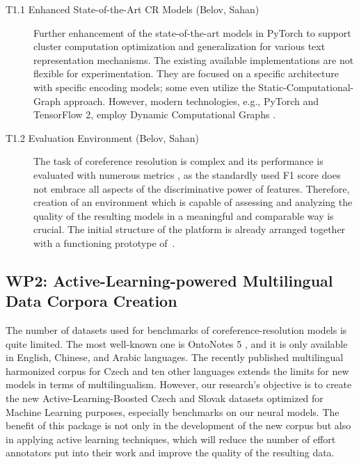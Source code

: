 \begin{description}
	\item [T1.1 Enhanced State-of-the-Art CR Models (Belov, Sahan)] Further enhancement of the state-of-the-art models in PyTorch to support cluster computation optimization and generalization for various text representation mechanisms. The existing available implementations are not flexible for experimentation. They are focused on a specific architecture with specific encoding models; some even utilize the Static-Computational-Graph approach. However, modern technologies, e.g., PyTorch and TensorFlow 2, employ Dynamic Computational Graphs \cite{computationalgraph-Neubig2017}. 
	\item [T1.2 Evaluation Environment (Belov, Sahan)] The task of coreference resolution is complex and its performance is evaluated with numerous metrics \cite{muc-Vilain1995,b3-Bagga1998,ceaf-Luo2005}, as the standardly used F1 score \cite{f1-Chen2006} does not embrace all aspects of the discriminative power of features. Therefore, creation of an environment which is capable of assessing and analyzing the quality of the resulting models in a meaningful and comparable way is crucial. The initial structure of the platform is already arranged together with a functioning prototype of~\cite{Kirstain2021S2E}. 
\end{description}


\subsection*{WP2: Active-Learning-powered Multilingual Data Corpora Creation}

 The number of datasets used for benchmarks of coreference-resolution models is quite limited. 
The most well-known one is OntoNotes 5 \cite{ontonotes5-Weischedel2013}, and it is only available in English, Chinese, and Arabic languages.
The recently published multilingual harmonized corpus for Czech and ten other languages \cite{cr-mult-Nedoluzhko2021} extends the limits for new models in terms of multilingualism. 
However, our research's objective is to create the new Active-Learning-Boosted Czech and Slovak datasets optimized for Machine Learning purposes, especially benchmarks on our neural models. 
The benefit of this package is not only in the development of the new corpus but also in applying active learning techniques, which will reduce the number of effort annotators put into their work and improve the quality of the resulting data. 

